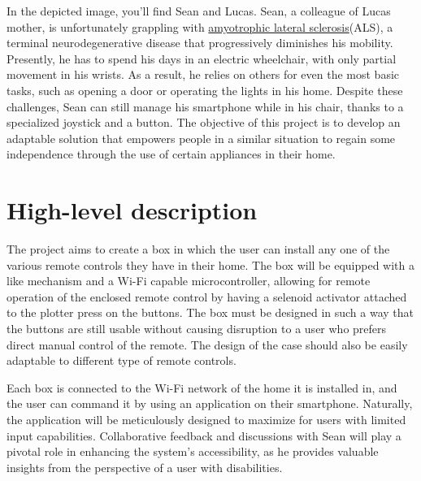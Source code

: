 \begin{minipage}[t]{0.65\textwidth}
    In the depicted image, you'll find Sean and Lucas.
    Sean, a colleague of Lucas mother, is unfortunately grappling with \href{https://en.wikipedia.org/wiki/ALS}{amyotrophic lateral sclerosis}\footnotemark (ALS), a terminal neurodegenerative disease that progressively diminishes his mobility.
    Presently, he has to spend his days in an electric wheelchair, with only partial movement in his wrists.
    As a result, he relies on others for even the most basic tasks, such as opening a door or operating the lights in his home.
    Despite these challenges, Sean can still manage his smartphone while in his chair, thanks to a specialized joystick and a button.
    The objective of this project is to develop an adaptable solution that empowers people in a similar situation to regain some independence through the use of certain appliances in their home.
\end{minipage}\hfill
\begin{minipage}[t]{0.30\textwidth}
  \centering{}
\end{minipage}

\vspace{-10pt}

\section{High-level description}

The project aims to create a box in which the user can install any one of the various remote controls they have in their home.
The box will be equipped with a  like mechanism and a Wi-Fi capable microcontroller, allowing for remote operation of the enclosed remote control by having a selenoid activator attached to the plotter press on the buttons.
The box must be designed in such a way that the buttons are still usable without causing disruption to a user who prefers direct manual control of the remote.
The design of the case should also be easily adaptable to different type of remote controls.

Each box is connected to the Wi-Fi network of the home it is installed in, and the user can command it by using an application on their smartphone.
Naturally, the application will be meticulously designed to maximize  for users with limited input capabilities.
Collaborative feedback and discussions with Sean will play a pivotal role in enhancing the system's accessibility, as he provides valuable insights from the perspective of a user with disabilities.

